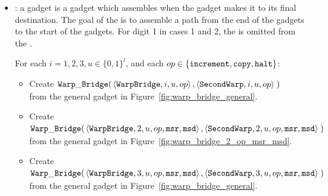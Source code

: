 \begin{itemize}
    \item {\warpbridge}: a {\warpbridge} gadget is a gadget which assembles when the {\firstwarp} gadget makes it
         to its final destination. The goal of the {\warpbridge} is to assemble a path from the end of the {\firstwarp}
         gadgets to the start of the {\secondwarp} gadgets. For digit 1 in cases 1 and 2, the {\warpbridge} is omitted
         from the {\warpunit}.

    For each $i = 1,2,3, u \in \{0, 1\}^l$, and each $op \in \{ {\tt increment}, {\tt copy}, {\tt halt} \}$:
    \begin{itemize}

        \item Create
        $\begin{aligned}[t]
            {\tt Warp\_Bridge}(& \left\langle {\tt WarpBridge}, i, u, op \right\rangle,
                          \left\langle {\tt SecondWarp}, i, u, op \right\rangle \;)
        \end{aligned}$ \\ from the general gadget in Figure~\ref{fig:warp_bridge_general}.
        \vspace{.5cm}

        \item Create
        $\begin{aligned}[t]
            {\tt Warp\_Bridge}(& \left\langle {\tt WarpBridge}, 2, u, op, {\tt msr}, {\tt msd} \right\rangle,
                          \left\langle {\tt SecondWarp}, 2, u, op, {\tt msr}, {\tt msd} \right\rangle \;)
        \end{aligned}$ \\ from the general gadget in Figure~\ref{fig:warp_bridge_2_op_msr_msd}.
        \vspace{.5cm}

        \item Create
        $\begin{aligned}[t]
            {\tt Warp\_Bridge}(& \left\langle {\tt WarpBridge}, 3, u, op, {\tt msr}, {\tt msd} \right\rangle,
                          \left\langle {\tt SecondWarp}, 3, u, op, {\tt msr}, {\tt msd} \right\rangle \;)
        \end{aligned}$ \\ from the general gadget in Figure~\ref{fig:warp_bridge_general}.
        \vspace{.5cm}
    \end{itemize}



\end{itemize}
